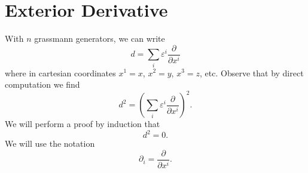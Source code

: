 \section{Exterior Derivative}

With $n$ grassmann generators, we can write
\begin{equation}
d = \sum_{i}\varepsilon^{i}\frac{\partial}{\partial x^i}
\end{equation}
where in cartesian coordinates $x^1=x$, $x^2=y$, $x^3=z$, etc. Observe that
by direct computation we find
\begin{equation}
d^2 = \left(\sum_{i}\varepsilon^{i}\frac{\partial}{\partial x^i} \right)^2.
\end{equation}
We will perform a proof by induction that
\begin{equation}
d^2 = 0.
\end{equation}
We will use the notation
\begin{equation}
\partial_{i} = \frac{\partial}{\partial x^i}.
\end{equation}

